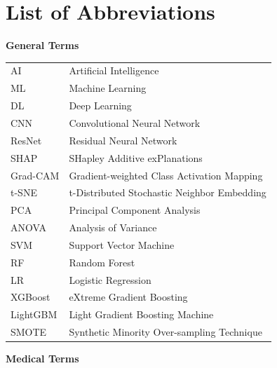 \documentclass[12pt, a4paper]{article}
\begin{document}
\listoftables


\clearpage

\chapter*{List of Abbreviations}

\textbf{General Terms}

\begin{tabular}{ll}
AI & Artificial Intelligence \\
ML & Machine Learning \\
DL & Deep Learning \\
CNN & Convolutional Neural Network \\
ResNet & Residual Neural Network \\
SHAP & SHapley Additive exPlanations \\
Grad-CAM & Gradient-weighted Class Activation Mapping \\
t-SNE & t-Distributed Stochastic Neighbor Embedding \\
PCA & Principal Component Analysis \\
ANOVA & Analysis of Variance \\
SVM & Support Vector Machine \\
RF & Random Forest \\
LR & Logistic Regression \\
XGBoost & eXtreme Gradient Boosting \\
LightGBM & Light Gradient Boosting Machine \\
SMOTE & Synthetic Minority Over-sampling Technique \\
\end{tabular}

\vspace{0.5cm}
\textbf{Medical Terms}
\end{document}
